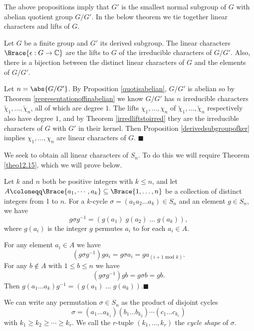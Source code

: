 \documentclass[../Project.tex]{subfiles}
\begin{document}
The above propositions imply that $G'$ is the smallest normal subgroup of $G$ with abelian quotient group $G/G'$. In the below theorem we tie together linear characters and lifts of $G$.
\begin{theo}[{\cite[Theorem 17.11]{2}}]
	Let $G$ be a finite group and $G'$ its derived subgroup. The linear characters $\Brace{\epsilon : G \to \mathbb{C}}$ are the lifts to $G$ of the irreducible characters of $G/G'$. Also, there is a bijection between the distinct linear characters of $G$ and the elements of $G/G'$.
	\label{numlineareqnumirr}
\end{theo}
\begin{proo*}[{\cite[Theorem 17.11]{2}}]
	Let $n = \abs{G/G'}$.  By Proposition \ref{quotisabelian}, $G/G'$ is abelian so by 
	Theorem \ref{representationoffinabelian} we know $G/G'$ has $n$ irreducible characters $\tilde\chi_1,\dots,\tilde\chi_n$, all of which are degree $1$. The lifts $\chi_1,\dots,\chi_n$ of $\tilde\chi_1,\dots,\tilde\chi_n$ respectively also have degree $1$, and by Theorem \ref{irredliftstoirred} they are the irreducible characters of $G$ with $G'$ in their kernel. Then Proposition  \ref{derivedsubgroupofker} implies $\chi_1,\dots,\chi_n$ are linear characters of $G$. \hfill$\blacksquare$\\
\end{proo*}

We seek to obtain all linear characters of $S_n$. To do this we will require Theorem \ref{theo12.15}, which we will prove below.
\begin{prop}[{\cite[Proposition 12.13]{2}}]
	Let $k$ and $n$ both be positive integers with $k \leqslant n$, and let $A \coloneqq \Brace{a_1,\cdots,a_k} \subseteq \Brace{1,\dots,n}$ be a collection of distinct integers from 1 to $n$. For a $k$-cycle $\sigma = (a_1a_2\dots a_k) \in S_n$ and an element $g \in S_n$, we have
	$$g\sigma g^{-1} = (g(a_1)\;g(a_2)\;\dots\;g(a_k)),$$
	where $g(a_i)$ is the integer $g$ permutes $a_i$ to for each $a_i \in A$.
	\label{elementscycnot}
\end{prop}
\begin{proo*}[{\cite[Proposition 12.13]{2}}]
	For any element $a_i \in A$ we have
	$$(g\sigma g^{-1})ga_i = g\sigma a_i = ga_{(i+1 \text{ mod } k)}.$$
	For any $b \notin A$ with $1 \leqslant b \leqslant n$ we have
	$$(g\sigma g^{-1})gb = g\sigma b = gb.$$
	Then $g(a_1\dots a_k)g^{-1} = (g(a_1)\;\dots\; g(a_k)).$\hfill$\blacksquare$
\end{proo*}

\begin{defi}
	We can write any permutation $\sigma \in S_n$ as the product of disjoint cycles
	$$\sigma = (a_1\dots a_{k_1})(b_1\dots b_{k_2})\cdots(c_1\dots c_{k_r})$$
	with $k_1 \geqslant k_2 \geqslant \cdots \geqslant k_r$.
	We call the $r$-tuple $(k_1,\dots,k_r)$ the \textit{cycle shape} of $\sigma$.
\end{defi}
\end{document}
